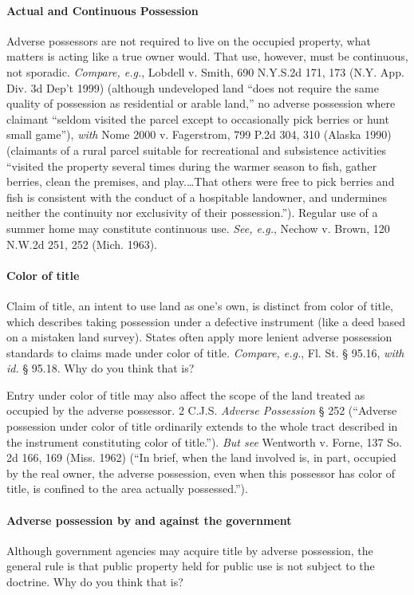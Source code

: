 \paragraph{Actual and Continuous Possession} Adverse possessors are
not required to live on the occupied property, what matters is acting like a
true owner would. That use, however, must be continuous, not sporadic.
\textit{Compare, e.g.}, Lobdell v. Smith, 690 N.Y.S.2d 171, 173 (N.Y. App. Div.
3d Dep't 1999) (although undeveloped land ``does not require the same quality
of possession as residential or arable land,'' no adverse possession where
claimant ``seldom visited the parcel except to occasionally pick berries or
hunt small game''), \textit{with} Nome 2000 v. Fagerstrom, 799 P.2d 304, 310
(Alaska 1990) (claimants of a rural parcel suitable for recreational and
subsistence activities ``visited the property several times during the warmer
season to fish, gather berries, clean the premises, and play.\ldots That
others were free to pick berries and fish is consistent with the conduct of a
hospitable landowner, and undermines neither the continuity nor exclusivity of
their possession.''). Regular use of a summer home may constitute continuous
use. \textit{See, e.g.}, Nechow v. Brown, 120 N.W.2d 251, 252 (Mich. 1963).

\paragraph{Color of title} Claim of title, an intent to use land as one's
own, is distinct from color of title, which describes taking possession under a
defective instrument (like a deed based on a mistaken land survey). States
often apply more lenient adverse possession standards to claims made under
color of title. \textit{Compare, e.g.}, Fl. St. {\S} 95.16, \textit{with id.
}{\S} 95.18. Why do you think that is? 

Entry under color of title may also affect the scope of the land treated as
occupied by the adverse possessor. 2 C.J.S. \textit{Adverse Possession} {\S}
252 (``Adverse possession under color of title ordinarily extends to the whole
tract described in the instrument constituting color of title.''). \textit{But
see} Wentworth v. Forne, 137 So. 2d 166, 169 (Miss. 1962) (``In brief, when the
land involved is, in part, occupied by the real owner, the adverse possession,
even when this possessor has color of title, is confined to the area actually
possessed.'').

\paragraph{Adverse possession by and against the government}
Although government agencies may acquire title by adverse possession, the
general rule is that public property held for public use is not subject to the
doctrine. Why do you think that is?

